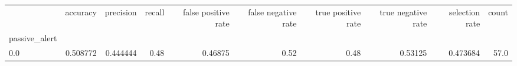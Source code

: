 \begin{tabular}{lrrrrrrrrr}
\toprule
{} &  accuracy &  precision &  recall &  false positive rate &  false negative rate &  true positive rate &  true negative rate &  selection rate &  count \\
passive\_alert &           &            &         &                      &                      &                     &                     &                 &        \\
\midrule
0.0           &  0.508772 &   0.444444 &    0.48 &              0.46875 &                 0.52 &                0.48 &             0.53125 &        0.473684 &   57.0 \\
\bottomrule
\end{tabular}
